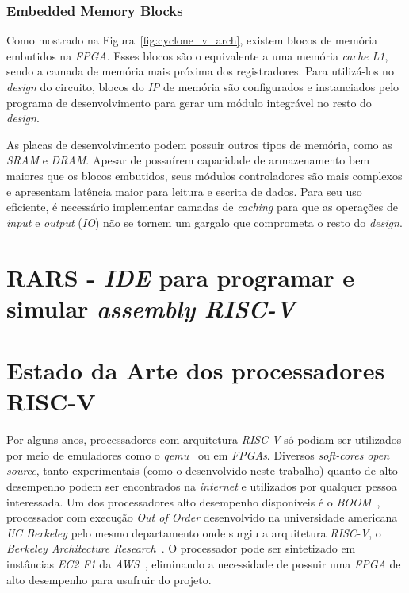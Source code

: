         \subsubsection{Embedded Memory Blocks}
        { Como mostrado na Figura~\ref{fig:cyclone_v_arch}, existem blocos de
            memória embutidos na \textit{FPGA}. Esses blocos são o equivalente
            a uma memória \textit{cache L1}, sendo a camada de memória mais próxima
            dos registradores. Para utilizá-los no \textit{design} do circuito,
            blocos do \textit{IP} de memória são configurados e instanciados
            pelo programa de desenvolvimento para gerar um módulo integrável no
            resto do \textit{design}.
        }

        { As placas de desenvolvimento podem possuir outros tipos de memória,
            como as \textit{SRAM} e \textit{DRAM}. Apesar de possuírem capacidade
            de armazenamento bem maiores que os blocos embutidos, seus
            módulos controladores são mais complexos e apresentam latência maior
            para leitura e escrita de dados. Para seu uso eficiente, é necessário
            implementar camadas de \textit{caching} para que as operações de
            \textit{input} e \textit{output} (\textit{IO}) não se tornem um
            gargalo que comprometa o resto do \textit{design}.
        }

\section{RARS - \textit{IDE} para programar e simular \textit{assembly RISC-V}}
{}


\section{Estado da Arte dos processadores RISC-V}
{ Por alguns anos, processadores com arquitetura \textit{RISC-V} só podiam
    ser utilizados por meio de emuladores como o \textit{qemu}~\cite{qemu_riscv}
    ou em \textit{FPGAs}. Diversos \textit{soft-cores} \textit{open source},
    tanto experimentais (como o desenvolvido neste trabalho) quanto de alto
    desempenho podem ser encontrados na \textit{internet} e utilizados por
    qualquer pessoa interessada. Um dos processadores alto desempenho disponíveis
    é o \textit{BOOM}~\cite{boom_berkeley}, processador com execução
    \textit{Out of Order} desenvolvido na universidade americana \textit{UC Berkeley}
    pelo mesmo departamento onde surgiu a arquitetura \textit{RISC-V}, o
    \textit{Berkeley Architecture Research}~\cite{berkeley_bar}. O processador
    pode ser sintetizado em instâncias \textit{EC2 F1} da
    \textit{AWS}~\cite{boom_aws}, eliminando a necessidade de possuir uma
    \textit{FPGA} de alto desempenho para usufruir do projeto.
}

